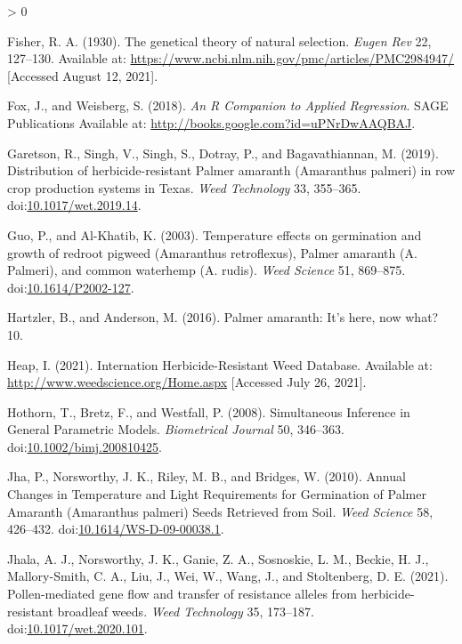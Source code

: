 \documentclass[utf8]{frontiersSCNS}
\newlength{\cslhangindent}
\newenvironment{CSLReferences}[2] %
 {%
  \setlength{\parindent}{0pt}
  \ifodd #1 \everypar{\setlength{\hangindent}{\cslhangindent}}\ignorespaces\fi
  \ifnum #2 > 0
  \setlength{\parskip}{#2\baselineskip}
  \fi
 }%
 {}
\begin{document}
\begin{CSLReferences}{1}{0}
\leavevmode\hypertarget{ref-fisher1930}{}%
Fisher, R. A. (1930). The genetical theory of natural selection.
\emph{Eugen Rev} 22, 127--130. Available at:
\url{https://www.ncbi.nlm.nih.gov/pmc/articles/PMC2984947/} {[}Accessed
August 12, 2021{]}.

\leavevmode\hypertarget{ref-fox2018}{}%
Fox, J., and Weisberg, S. (2018). \emph{An {R Companion} to {Applied
Regression}}. {SAGE Publications} Available at:
\url{http://books.google.com?id=uPNrDwAAQBAJ}.

\leavevmode\hypertarget{ref-garetson2019}{}%
Garetson, R., Singh, V., Singh, S., Dotray, P., and Bagavathiannan, M.
(2019). Distribution of herbicide-resistant {Palmer} amaranth
({Amaranthus} palmeri) in row crop production systems in {Texas}.
\emph{Weed Technology} 33, 355--365.
doi:\href{https://doi.org/10.1017/wet.2019.14}{10.1017/wet.2019.14}.

\leavevmode\hypertarget{ref-guo2003}{}%
Guo, P., and Al-Khatib, K. (2003). Temperature effects on germination
and growth of redroot pigweed ({Amaranthus} retroflexus), {Palmer}
amaranth ({A}. Palmeri), and common waterhemp ({A}. rudis). \emph{Weed
Science} 51, 869--875.
doi:\href{https://doi.org/10.1614/P2002-127}{10.1614/P2002-127}.

\leavevmode\hypertarget{ref-hartzler2016}{}%
Hartzler, B., and Anderson, M. (2016). Palmer amaranth: {It}'s here, now
what? 10.

\leavevmode\hypertarget{ref-heap2021}{}%
Heap, I. (2021). Internation {Herbicide}-{Resistant Weed Database}.
Available at: \url{http://www.weedscience.org/Home.aspx} {[}Accessed
July 26, 2021{]}.

\leavevmode\hypertarget{ref-hothorn2008}{}%
Hothorn, T., Bretz, F., and Westfall, P. (2008). Simultaneous
{Inference} in {General Parametric Models}. \emph{Biometrical Journal}
50, 346--363.
doi:\href{https://doi.org/10.1002/bimj.200810425}{10.1002/bimj.200810425}.

\leavevmode\hypertarget{ref-jha2010}{}%
Jha, P., Norsworthy, J. K., Riley, M. B., and Bridges, W. (2010). Annual
{Changes} in {Temperature} and {Light Requirements} for {Germination} of
{Palmer Amaranth} ({Amaranthus} palmeri) {Seeds Retrieved} from {Soil}.
\emph{Weed Science} 58, 426--432.
doi:\href{https://doi.org/10.1614/WS-D-09-00038.1}{10.1614/WS-D-09-00038.1}.

\leavevmode\hypertarget{ref-jhala2021}{}%
Jhala, A. J., Norsworthy, J. K., Ganie, Z. A., Sosnoskie, L. M., Beckie,
H. J., Mallory-Smith, C. A., Liu, J., Wei, W., Wang, J., and
Stoltenberg, D. E. (2021). Pollen-mediated gene flow and transfer of
resistance alleles from herbicide-resistant broadleaf weeds. \emph{Weed
Technology} 35, 173--187.
doi:\href{https://doi.org/10.1017/wet.2020.101}{10.1017/wet.2020.101}.


\end{CSLReferences}
\end{document}
